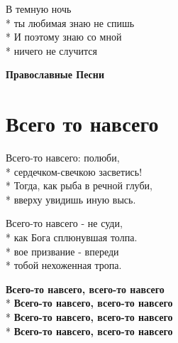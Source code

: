 \medskip

\begin{minipage}{\linewidth}
В темную ночь\\*
ты любимая знаю не спишь\\*
И поэтому знаю со мной\\*
ничего не случится\\
\end{minipage}

\vspace{\fill}\newpage

\cleardoublepage
\thispagestyle{empty}
\vspace*{\fill}
{\centering\huge\bfseries Православные Песни\par}
\vspace*{\fill}
\newpage
\section{Всего то навсего}
\label{song:Всего_то_навсего}

\medskip

\begin{minipage}{\linewidth}
Всего-то навсего: полюби,\\*
сердечком-свечкою засветись!\\*
Тогда, как рыба в речной глуби,\\*
вверху увидишь иную высь.\\
\end{minipage}\par\medskip\nobreak

\medskip

\begin{minipage}{\linewidth}
Всего-то навсего - не суди,\\*
как Бога сплюнувшая толпа. \\*
вое призвание - впереди\\*
тобой нехоженная тропа.\\
\end{minipage}\par\medskip\nobreak

\medskip

\begin{minipage}{\linewidth}
\hspace*{1.5em}\textbf{Всего-то навсего, всего-то навсего}\\*
\hspace*{1.5em}\textbf{Всего-то навсего, всего-то навсего}\\*
\hspace*{1.5em}\textbf{Всего-то навсего, всего-то навсего}\\*
\hspace*{1.5em}\textbf{Всего-то навсего, всего-то навсего}\\
\end{minipage}\par\medskip\nobreak

